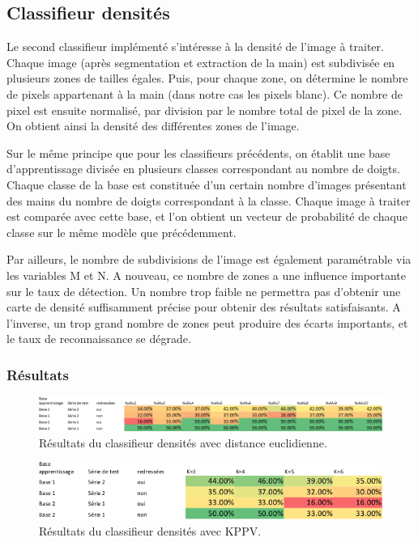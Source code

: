\subsection{Classifieur densités}

Le second classifieur implémenté s'intéresse à la densité de l'image à traiter. Chaque image (après segmentation et extraction de la main) est subdivisée en plusieurs zones de tailles égales. Puis, pour chaque zone, on détermine le nombre de pixels appartenant à la main (dans notre cas les pixels blanc). Ce nombre de pixel est ensuite normalisé, par division par le nombre total de pixel de la zone. On obtient ainsi la densité des différentes zones de l'image.

	Sur le même principe que pour les classifieurs précédents, on établit une base d'apprentissage divisée en plusieurs classes correspondant au nombre de doigts. Chaque classe de la base est constituée d'un certain nombre d'images présentant des mains du nombre de doigts correspondant à la classe. Chaque image à traiter est comparée avec cette base, et l'on obtient un vecteur de probabilité de chaque classe sur le même modèle que précédemment.

	Par ailleurs, le nombre de subdivisions de l'image est également paramétrable via les variables M et N. A nouveau, ce nombre de zones a une influence importante sur le taux de détection. Un nombre trop faible ne permettra pas d'obtenir une carte de densité suffisamment précise pour obtenir des résultats satisfaisants. A l'inverse, un trop grand nombre de zones peut produire des écarts importants, et le taux de reconnaissance se dégrade.

\subsubsection{Résultats}
\begin{figure}[htb!]
\centerline{\includegraphics[scale=0.7]{table2.png}}
\caption{Résultats du classifieur densités avec distance euclidienne.}
\end{figure}

\begin{figure}[htb!]
\centerline{\includegraphics[scale=0.7]{table3.png}}
\caption{Résultats du classifieur densités avec KPPV.}
\end{figure}